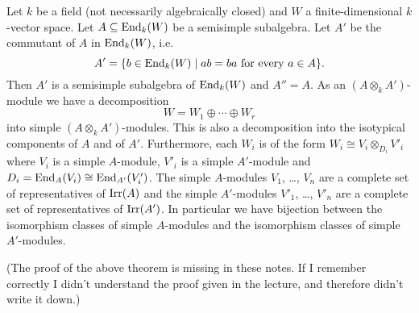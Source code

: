 \begin{thrm}
  Let $k$ be a field (not necessarily algebraically closed) and $W$ a finite-dimensional $k$-vector space.
  Let $A \subseteq \operatorname{End}_k(W)$ be a semisimple subalgebra.
  Let $A'$ be the commutant of $A$ in $\operatorname{End}_k(W)$, i.e.\
  \[
      A'
    = \{
        b \in \operatorname{End}_k(W)
        \mid
        a b = b a
        \text{ for every }
        a \in A
      \}.
  \]
  Then $A'$ is a semisimple subalgebra of $\operatorname{End}_k(W)$ and $A'' = A$.
  As an $(A \otimes_k A')$-module we have a decomposition
  \[
    W = W_1 \oplus \dotsb \oplus W_r
  \]
  into simple $(A \otimes_k A')$-modules.
  This is also a decomposition into the isotypical components of $A$ and of $A'$.
  Furthermore, each $W_i$ is of the form $W_i \cong V_i \otimes_{D_i} V'_i$ where $V_i$ is a simple $A$-module, $V'_i$ is a simple $A'$-module and $D_i = \operatorname{End}_A(V_i) \cong \operatorname{End}_{A'}(V'_i)$.
  The simple $A$-modules $V_1$, \dots, $V_n$ are a complete set of representatives of $\operatorname{Irr}(A)$ and the simple $A'$-modules $V'_1$, \dots, $V'_n$ are a complete set of representatives of $\operatorname{Irr}(A')$.
  In particular we have bijection between the isomorphism classes of simple $A$-modules and the isomorphism classes of simple $A'$-modules.
\end{thrm}


(The proof of the above theorem is missing in these notes.
If I remember correctly I didn’t understand the proof given in the lecture, and therefore didn’t write it down.)


